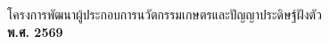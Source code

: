 \begin{titlepage}
\vspace{0.14in}
{\fontsize{9}{12}\selectfont\color{white!60}
โครงการพัฒนาผู้ประกอบการนวัตกรรมเกษตรและปัญญาประดิษฐ์ฝังตัว}\\
{\fontsize{10}{13}\selectfont\bfseries\color{green!45!yellow}พ.ศ. 2569}

\vspace*{0.16in}
\endgroup
\end{titlepage}
\pagecolor{white}
\cleardoublepage
